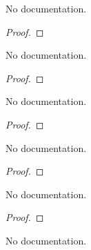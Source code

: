 \begin{theorem}\label{val_map_inv_le_val_iff}
        \leanok
                No documentation.
    \end{theorem}

\begin{proof}
    \leanok
\end{proof}

\begin{theorem}\label{val_le_val_map_inv_iff}
        \leanok
                No documentation.
    \end{theorem}

\begin{proof}
    \leanok
\end{proof}

\begin{theorem}\label{val_map_inv_lt_val_iff}
        \leanok
                No documentation.
    \end{theorem}

\begin{proof}
    \leanok
\end{proof}

\begin{theorem}\label{val_lt_val_map_inv_iff}
        \leanok
                No documentation.
    \end{theorem}

\begin{proof}
    \leanok
\end{proof}

\begin{theorem}\label{ext}
        \leanok
                No documentation.
    \end{theorem}

\begin{proof}
    \leanok
\end{proof}

\begin{theorem}\label{bijective}
        \leanok
                No documentation.
    \end{theorem}

